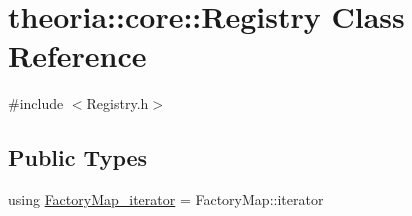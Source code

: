 \hypertarget{classtheoria_1_1core_1_1Registry}{}\section{theoria\+:\+:core\+:\+:Registry Class Reference}
\label{classtheoria_1_1core_1_1Registry}


{\ttfamily \#include $<$Registry.\+h$>$}

\subsection*{Public Types}
\begin{DoxyCompactItemize}
\item 
using \hyperlink{classtheoria_1_1core_1_1Registry_ae131721f32d396fad4d2d48b0438dca1}{Factory\+Map\+\_\+iterator} = Factory\+Map\+::iterator
\end{DoxyCompactItemize}
